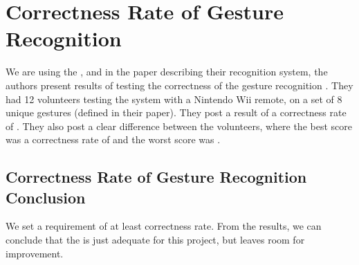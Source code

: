 \section{Correctness Rate of Gesture Recognition}\label{sec:gesturecorrectness}
We are using the \threedollar, 
and in the paper describing their recognition system, 
the authors present results of testing the correctness of the gesture recognition \cite{threedollar}.
They had \num{12} volunteers testing the system with a Nintendo Wii remote, 
on a set of \num{8} unique gestures (defined in their paper).
They post a result of a correctness rate of . 
They also post a clear difference between the volunteers, 
where the best score was a correctness rate of  and the worst score was . 
\subsection{Correctness Rate of Gesture Recognition Conclusion}
We set a requirement of at least  correctness rate. 
From the results, we can conclude that the \threedollar is just adequate for this project, 
but leaves room for improvement. 